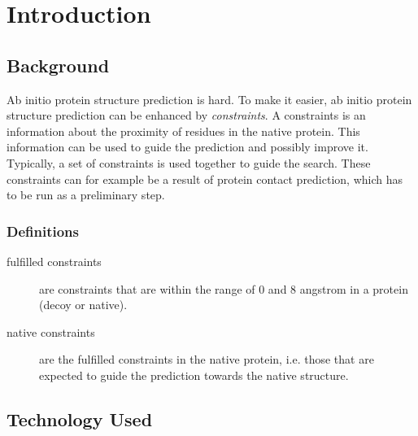 \documentclass[a4paper, 11pt, parskip=half]{scrartcl}
\title{\titleString}
\author{David Lassner}
\author{Moritz Neeb}
\affil{\groupName}
\begin{document}
\maketitle



\section{Introduction}

\subsection{Background}

Ab initio protein structure prediction is hard.
To make it easier, ab initio protein structure prediction
can be enhanced by \emph{constraints}.
A constraints is an information about the proximity of residues in the native protein.
This information can be used to guide the prediction and possibly improve it.
Typically, a set of constraints is used together to guide the search.
These constraints can for example be a result of protein contact prediction,
which has to be run as a preliminary step.

\subsubsection*{Definitions}
\begin{description}
  \item[fulfilled constraints] are constraints that are within the range of $0$ and $8$ angstrom in a protein (decoy or native).
  \item[native constraints] are the fulfilled constraints in the native protein,
  i.e. those that are expected to guide the prediction towards the native structure.
\end{description}

\subsection{Technology Used}
\end{document}

